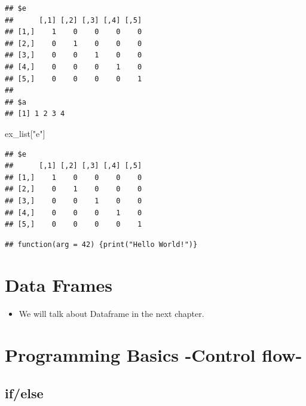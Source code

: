 \documentclass[]{book}
\newenvironment{Shaded}{\begin{snugshade}}{\end{snugshade}}
\newcommand{\StringTok}[1]{\textcolor[rgb]{0.31,0.60,0.02}{#1}}
\newcommand{\OperatorTok}[1]{\textcolor[rgb]{0.81,0.36,0.00}{\textbf{#1}}}
\newcommand{\NormalTok}[1]{#1}
\providecommand{\tightlist}{%
  \setlength{\itemsep}{0pt}\setlength{\parskip}{0pt}}
\begin{document}
\begin{verbatim}
## $e
##      [,1] [,2] [,3] [,4] [,5]
## [1,]    1    0    0    0    0
## [2,]    0    1    0    0    0
## [3,]    0    0    1    0    0
## [4,]    0    0    0    1    0
## [5,]    0    0    0    0    1
## 
## $a
## [1] 1 2 3 4
\end{verbatim}

\begin{Shaded}
\begin{Highlighting}[]
\NormalTok{ex_list[}\StringTok{"e"}\NormalTok{]}
\end{Highlighting}
\end{Shaded}

\begin{verbatim}
## $e
##      [,1] [,2] [,3] [,4] [,5]
## [1,]    1    0    0    0    0
## [2,]    0    1    0    0    0
## [3,]    0    0    1    0    0
## [4,]    0    0    0    1    0
## [5,]    0    0    0    0    1
\end{verbatim}

\begin{Shaded}
\end{Shaded}

\begin{verbatim}
## function(arg = 42) {print("Hello World!")}
\end{verbatim}

\section{Data Frames}\label{data-frames}

\begin{itemize}
\tightlist
\item
  We will talk about Dataframe in the next chapter.
\end{itemize}

\section{Programming Basics -Control
flow-}\label{programming-basics--control-flow-}

\subsection{if/else}\label{ifelse}
\end{document}
